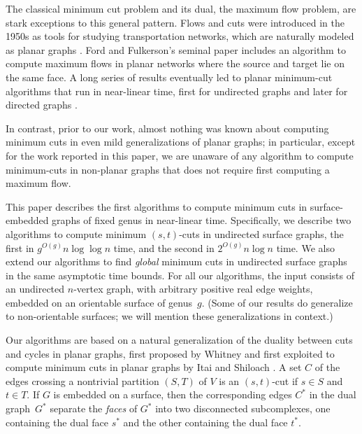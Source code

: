 \documentclass[letterpaper,review]{siamart190516}
\begin{document}
The classical minimum cut problem and its dual, the maximum flow problem, are stark exceptions to this general pattern.  Flows and cuts were introduced in the 1950s as tools for studying transportation networks, which are naturally modeled as planar graphs \cite{hr-fmern-55}.  Ford and Fulkerson's seminal paper \cite{ff-mfn-56} includes an algorithm to compute maximum flows in planar networks where the source and target lie on the same face.  A long series of results eventually led to planar minimum-cut algorithms that run in near-linear time, first for undirected graphs \cite{r-mstcp-83, hj-oamfu-85, f-faspp-87, insw-iamcmf-11} and later for directed graphs \cite{jk-mcdpn-92, hkrs-fspap-97, mnnw-mdpgo-15}.

In contrast, prior to our work, almost nothing was known about computing minimum cuts in even mild generalizations of planar graphs; in particular, except for the work reported in this paper, we are unaware of any algorithm to compute minimum-cuts in non-planar graphs that does not require first computing a maximum flow.  

This paper describes the first algorithms to compute minimum cuts in surface-embedded graphs of fixed genus in near-linear time.  Specifically, we describe two algorithms to compute minimum $(s,t)$-cuts in undirected surface graphs, the first in $g^{O(g)} n\log\log n$ time, and the second in $2^{O(g)} n\log n$ time.
We also extend our  algorithms to find \emph{global} minimum cuts in undirected surface graphs in the same asymptotic time bounds.  For all our algorithms, the input consists of an undirected $n$-vertex graph, with arbitrary positive real edge weights, embedded on an orientable surface of genus~$g$.  (Some of our results do generalize to non-orientable surfaces; we will mention these generalizations in context.)

Our algorithms are based on a natural generalization of the duality between cuts and cycles in planar graphs, first proposed by Whitney \cite{w-pg-33} and first exploited to compute minimum cuts in planar graphs by Itai and Shiloach \cite{is-mfpn-79}.  
A set $C$ of the edges crossing a nontrivial partition $(S,T)$ of $V$ is an $(s,t)$-cut if $s\in S$ and $t \in T$.
If $G$ is embedded on a surface, then the corresponding edges $C^*$ in the dual graph~$G^*$ separate the \emph{faces} of $G^*$ into two disconnected subcomplexes, one containing the dual face $s^*$ and the other containing the dual face $t^*$. 
\end{document}
